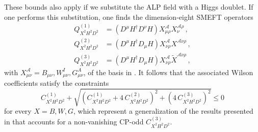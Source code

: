 These bounds also apply if we substitute the ALP field with a Higgs doublet.
If one performs this substitution, one finds the dimension-eight SMEFT operators
\begin{align}
    Q^{(1)}_{X^2 H^2 D^2} &= (D^\mu H^\dagger D^\nu H)X^{\mathscr A}_{ \mu\rho}X_\nu^{\mathscr A\rho}\,,
    \\
    Q^{(2)}_{X^2 H^2 D^2} &= (D^\mu H^\dagger D_\mu H)X^{\mathscr A}_{ \nu\rho}X^{\mathscr A \nu \rho}\,,
    \\
    Q^{(3)}_{X^2 H^2 D^2} &= (D^\mu H^\dagger D_\mu H)X^{\mathscr A}_{ \nu\rho}\widetilde X^{\mathscr A \nu \rho}\,,
\end{align}
with $X_{\mu\nu}^{\mathscr A} = B_{\mu\nu},W_{\mu\nu}^I,G_{\mu\nu}^A$, of the basis in \cite{Murphy:2020rsh}.
It follows that the associated Wilson coefficients satisfy the constraints
\begin{equation}
    C_{X^2 H^2 D^2}^{(1)} + \sqrt{\left(C_{X^2 H^2 D^2}^{(1)}+4\,C_{X^2 H^2 D^2}^{(2)}\right)^2+\left(4\,C_{X^2 H^2 D^2}^{(3)}\right)^2} \le 0
\end{equation}
for every $X=B,W,G$,
which represent a generalization of the results presented in \cite{Chala:2023xjy,Remmen:2019cyz} that accounts for a non-vanishing CP-odd $C_{X^2 H^2 D^2}^{(3)}$.

